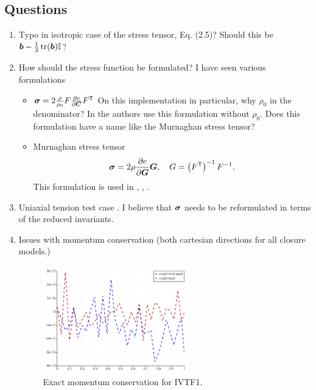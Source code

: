 \documentclass{article}
\begin{document}
\subsection{Questions}
\begin{enumerate}
   \item Typo in isotropic case of the stress tensor, Eq. (2.5)? Should this be ${\boldsymbol b} - \frac{1}{3}\operatorname{tr}({\boldsymbol b}){\mathbb I}$?
   \item How should the stress function be formulated?  I have seen various formulations
   \begin{itemize}
      \item ${\boldsymbol \sigma} = 2 \frac{\rho}{\rho_0} F \frac{\partial e}{\partial {\boldsymbol C}} F^{\mathsf T}$
      On this implementation in particular, why $\rho_0$ in the denominator?  In \cite[Eq.~17]{kluth-despres-2010} the authors use this formulation without $\rho_0$.
      Does this formulation have a name like the Murnaghan stress tensor?
      \item Murnaghan stress tensor
      \begin{equation}
         {\boldsymbol \sigma} = 2\rho \frac{\partial e}{\partial {\boldsymbol G}} {\boldsymbol G},\quad G = \left(F^{\mathsf T}\right)^{-1} F^{-1}.
      \end{equation}
      This formulation is used in \cite[Sec.~3.2]{favrie_gavrilyuk_saurel_2008}, \cite[Eq.~(14)]{boscheri-loubere-maire-2021}, \cite[p.~176]{gavrilyuk-book}.
   \end{itemize}
   \item Uniaxial tension test case \cite{chaimoon2019}.  I believe that ${\boldsymbol \sigma}$ needs to be reformulated in terms of the reduced invariants.
   \item Issues with momentum conservation (both cartesian directions for all closure models.)
   \begin{figure}[!htb]
      \centering
      \includegraphics[width=0.6\textwidth]{images/20251021/ivtf1-momentum-y-over-time.png}
      \caption{Exact momentum conservation for IVTF1.}

\end{figure}
\end{enumerate}
\end{document}
